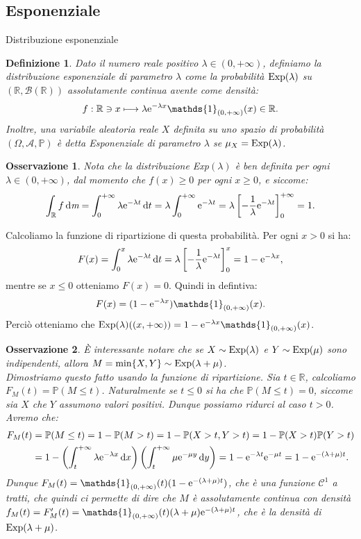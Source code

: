 \documentclass[11pt]{book}
\theoremstyle{Definizione}
\newtheorem*{mydef}{Definizione}
\theoremstyle{TeoremaProposizioneLemmaCorollario}
\theoremstyle{OsservazioneNota}
\newtheorem{myobs}{Osservazione}[section]
\newcommand{\R}{\mathbb{R}}
\renewcommand{\P}{\mathbb{P}}
\renewcommand{\d}{\mathrm{d}}
\newcommand{\dm}{\,\d \textit{m}}
\newcommand{\dx}{\,\d x}
\newcommand{\dy}{\,\d y}
\newcommand{\dt}{\,\d t}
\newcommand{\e}{\textup{e}}
\newcommand{\uno}[1]{\mathds{1}_{#1}}
\begin{document}
\subsection{Esponenziale}
\begin{boxdef}{Distribuzione esponenziale}
\begin{mydef}
Dato il numero reale positivo $\lambda \in (0,+\infty)$, definiamo la distribuzione esponenziale di parametro $\lambda$ come la probabilità $\textup{Exp}(\lambda)$ su $(\R,\mathcal{B}(\R))$ assolutamente continua avente come densità:
$$
f:\R \ni x \longmapsto \lambda \e^{-\lambda x} \uno{(0,+\infty)}(x)\in \R.
$$
Inoltre, una variabile aleatoria reale $X$ definita su uno spazio di probabilità $(\Omega,\mathcal{A},\P)$ è detta Esponenziale di parametro $\lambda$ se $\mu_X = \textup{Exp}(\lambda)$.
\end{mydef}
\end{boxdef}
\begin{myobs}
Nota che la distribuzione Exp$(\lambda)$ è ben definita per ogni $\lambda\in (0,+\infty)$, dal momento che $f(x) \geq 0$ per ogni $x\geq 0$, e siccome:
$$
\int_\R f \dm = \int_0^{+\infty} \lambda \e^{-\lambda t} \dt = \lambda \int_{0}^{+\infty}\e^{-\lambda t} = \lambda \left[-\frac{1}{\lambda}\e^{-\lambda t}\right]_0^{+\infty} = 1.
$$
\end{myobs}
Calcoliamo la funzione di ripartizione di questa probabilità. Per ogni $x> 0$ si ha:
$$
F(x) = \int_0^x \lambda \e^{-\lambda t}\dt = \lambda \left[-\frac{1}{\lambda}\e^{-\lambda t}\right]_0^x = 1-\e^{-\lambda x},
$$
mentre se $x \leq 0$ otteniamo $F(x) = 0$. Quindi in defintiva:
$$
F(x) = (1-\e^{-\lambda x})\uno{(0,+\infty)}(x).
$$
Perciò otteniamo che $\textup{Exp}(\lambda)((x,+\infty)) = 1-\e^{-\lambda x} \uno{(0,+\infty)}(x)$.
\begin{myobs}
È interessante notare che se $X \sim \textup{Exp}(\lambda)$ e $Y \sim \textup{Exp}(\mu)$ sono indipendenti, allora $M = \min\{X,Y\} \sim \textup{Exp}(\lambda+\mu)$.\\
Dimostriamo questo fatto usando la funzione di ripartizione. Sia $t\in \R$, calcoliamo $F_M(t) = \P(M \leq t)$. Naturalmente se $t \leq 0$ si ha che $\P(M \leq t) = 0$, siccome sia $X$ che $Y$ assumono valori positivi. Dunque possiamo ridurci al caso $ t >0$. Avremo che:
\begin{align*}
F_M(t) &= \P(M \leq t) = 1 - \P(M > t) = 1- \P(X > t, Y > t) = 1- \P(X > t)\P(Y > t) \\
&=1- \left(\int_{t}^{+\infty} \lambda \e^{-\lambda x}\dx\right)\left(\int_{t}^{+\infty}\mu \e^{-\mu y}\dy\right) = 1- \e^{-\lambda t}\e^{-\mu t} = 1- \e^{-(\lambda+\mu)t}.
\end{align*}
Dunque $F_M(t) = \uno{(0,+\infty)}(t)(1-\e^{-(\lambda+\mu)t})$, che è una funzione $\mathcal{C}^1$ a tratti, che quindi ci permette di dire che $M$ è assolutamente continua con densità $f_M(t) = F_M'(t) = \uno{(0,+\infty)}(t)(\lambda+\mu)\e^{-(\lambda+\mu) t}$, che è la densità di $\textup{Exp}(\lambda+\mu)$.
\end{myobs}
\end{document}
